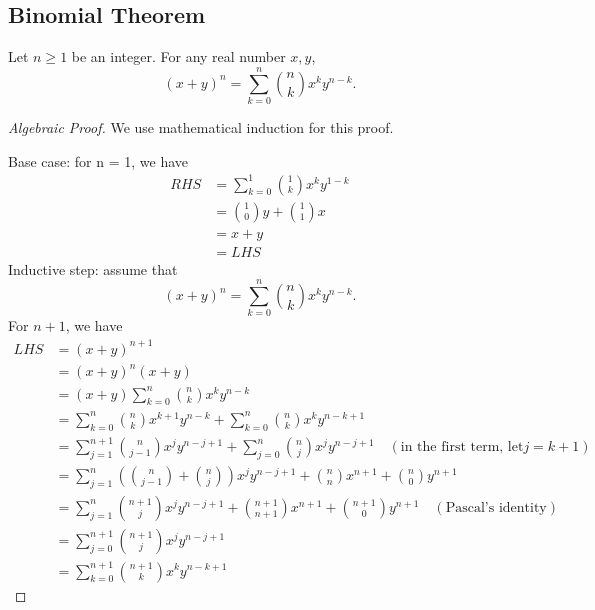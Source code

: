 \subsection{Binomial Theorem}
\begin{theorem}
	Let \(n \geq 1\) be an integer. For any real number \(x, y\),
	\[
		(x + y)^n = \sum_{k = 0}^n \binom{n}{k} x^k y^{n-k}.
	\]
\end{theorem}

\begin{proof}[Algebraic Proof]
	We use mathematical induction for this proof.

	Base case: for n = 1, we have
	\[
		\begin{aligned}
			RHS &= \sum_{k = 0}^1 \binom{1}{k} x^k y^{1-k} \\
			&= \binom{1}{0} y + \binom{1}{1}x \\
			&= x + y \\ 
			&= LHS
		\end{aligned}
	\]
	Inductive step: assume that
	\[
		(x + y)^n = \sum_{k = 0}^n \binom{n}{k} x^k y^{n-k}.
	\]
	For \(n + 1\), we have
	\[
		\begin{aligned}
			LHS &= (x + y)^{n+1} \\
			&= (x + y)^n (x + y) \\
			&= (x + y)\sum_{k = 0}^n \binom{n}{k} x^k y^{n-k} \\
			&= \sum_{k = 0}^n \binom{n}{k} x^{k+1}  y^{n-k} + \sum_{k = 0}^n \binom{n}{k} x^k y^{n-k+1}\\
			&= \sum_{j = 1}^{n+1} \binom{n}{j-1} x^j y^{n-j+1} + \sum_{j = 0}^n \binom{n}{j} x^j y^{n-j+1}\quad(\text{in the first term, let} j = k + 1)\\
			&= \sum_{j = 1}^{n} \left(\binom{n}{j-1} + \binom{n}{j}\right)x^j y^{n-j+1} + \binom{n}{n}x^{n+1} + \binom{n}{0}y^{n+1}  \\
			&= \sum_{j = 1}^{n} \binom{n+1}{j} x^j y^{n-j+1} + \binom{n+1}{n+1}x^{n+1} + \binom{n+1}{0}y^{n+1}\quad(\text{Pascal's identity}) \\
			&= \sum_{j = 0}^{n+1} \binom{n+1}{j} x^j y^{n-j+1} \\
			&= \sum_{k = 0}^{n+1} \binom{n+1}{k} x^k y^{n-k+1}
		\end{aligned}
	\]
\end{proof}

